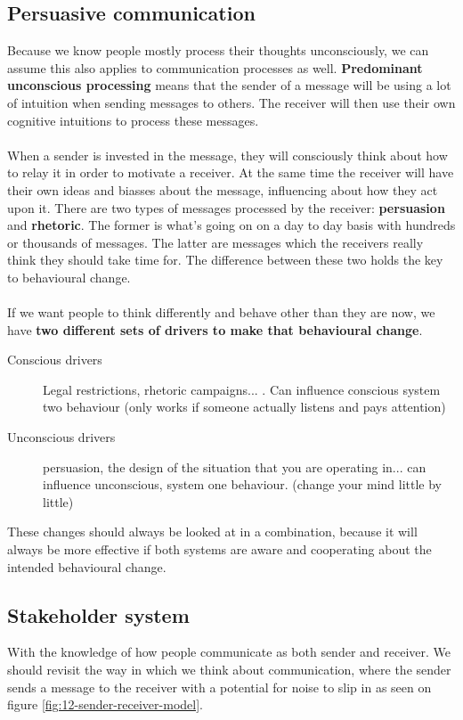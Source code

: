 \documentclass[../summary.tex]{subfiles}
\begin{document}
		\subsection{Persuasive communication}
			Because we know people mostly process their thoughts unconsciously, we can assume this also applies to communication processes as well. \textbf{Predominant unconscious processing} means that the sender of a message will be using a lot of intuition when sending messages to others. The receiver will then use their own cognitive intuitions to process these messages. \\
			\\
			When a sender is invested in the message, they will consciously think about how to relay it in order to motivate a receiver. At the same time the receiver will have their own ideas and biasses about the message, influencing about how they act upon it. There are two types of messages processed by the receiver: \textbf{persuasion} and \textbf{rhetoric}. The former is what's going on on a day to day basis with hundreds or thousands of messages. The latter are messages which the receivers really think they should take time for. The difference between these two holds the key to behavioural change.\\
			\\
			If we want people to think differently and behave other than they are now, we have \textbf{two different sets of drivers to make that behavioural change}.
			\begin{description}
				\item[Conscious drivers] Legal restrictions, rhetoric campaigns... . Can influence conscious system two behaviour (only works if someone actually listens and pays attention)
				\item[Unconscious drivers] persuasion, the design of the situation that you are operating in... can influence unconscious, system one behaviour.   (change your mind little by little)
			\end{description}
			These changes should always be looked at in a combination, because it will always be more effective if both systems are aware and cooperating about the intended behavioural change.
			
		\subsection{Stakeholder system}
			With the knowledge of how people communicate as both sender and receiver. We should revisit the way in which we think about communication, where the sender sends a message to the receiver with a potential for noise to slip in as seen on figure \ref{fig:12-sender-receiver-model}. \\
			
\end{document}
